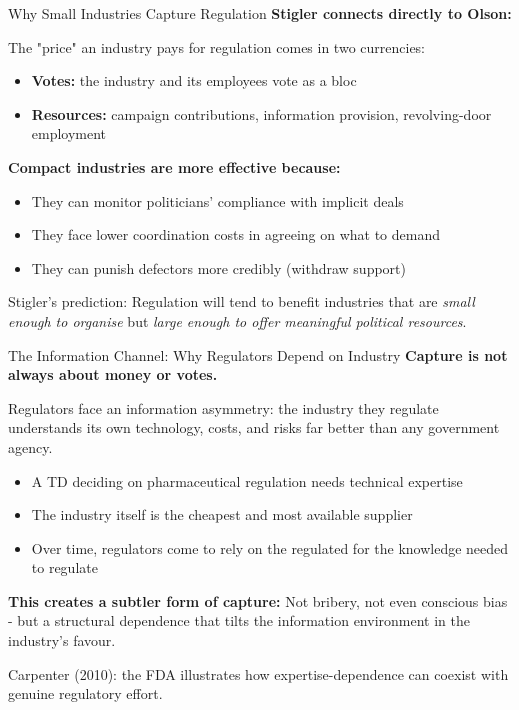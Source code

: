 \documentclass[10pt]{beamer}
\begin{document}
\begin{frame}{Why Small Industries Capture Regulation}
\textbf{Stigler connects directly to Olson:}

\vspace{0.1cm}
The "price" an industry pays for regulation comes in two currencies:
\begin{itemize}
\item \textbf{Votes:} the industry and its employees vote as a bloc
\item \textbf{Resources:} campaign contributions, information provision, revolving-door employment
\end{itemize}

\vspace{0.1cm}
\textbf{Compact industries are more effective because:}
\begin{itemize}
\item They can \alert{monitor} politicians' compliance with implicit deals
\item They face lower \alert{coordination costs} in agreeing on what to demand
\item They can \alert{punish} defectors more credibly (withdraw support)
\end{itemize}

\vspace{0.1cm}
\alert{Stigler's prediction:}
Regulation will tend to benefit industries that are \emph{small enough to organise} but \emph{large enough to offer meaningful political resources}.
\end{frame}


\begin{frame}{The Information Channel: Why Regulators Depend on Industry}
\textbf{Capture is not always about money or votes.}

\vspace{0.15cm}
Regulators face an \alert{information asymmetry}: the industry they regulate understands its own technology, costs, and risks far better than any government agency.

\begin{itemize}
\item A TD deciding on pharmaceutical regulation needs technical expertise
\item The industry itself is the cheapest and most available supplier
\item Over time, regulators come to rely on the regulated for the knowledge needed to regulate
\end{itemize}

\vspace{0.15cm}
\textbf{This creates a subtler form of capture:}
Not bribery, not even conscious bias - but a structural dependence that tilts the information environment in the industry's favour.

\vspace{0.15cm}
\footnotesize
\alert{Carpenter (2010):} the FDA illustrates how expertise-dependence can coexist with genuine regulatory effort.
\end{frame}
\end{document}
